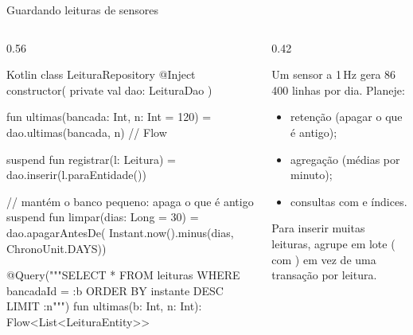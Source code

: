 \documentclass[aspectratio=169,10pt]{beamer}
\begin{document}
\begin{frame}[fragile]{Guardando leituras de sensores}
  \begin{columns}[T]
    \begin{column}{0.56\textwidth}
\begin{codigo}[title=LeituraRepository.kt]{Kotlin}
class LeituraRepository @Inject constructor(
  private val dao: LeituraDao
) {
  fun ultimas(bancada: Int, n: Int = 120) =
    dao.ultimas(bancada, n)          // Flow

  suspend fun registrar(l: Leitura) =
    dao.inserir(l.paraEntidade())

  // mantém o banco pequeno: apaga o que é antigo
  suspend fun limpar(dias: Long = 30) =
    dao.apagarAntesDe(
      Instant.now().minus(dias, ChronoUnit.DAYS))
}

@Query("""SELECT * FROM leituras WHERE bancadaId = :b
  ORDER BY instante DESC LIMIT :n""")
fun ultimas(b: Int, n: Int): Flow<List<LeituraEntity>>
\end{codigo}
    \end{column}
    \begin{column}{0.42\textwidth}
      \begin{atencao}
        Um sensor a 1\,Hz gera 86\,400 linhas por dia. Planeje:
        \begin{itemize}
          \item retenção (apagar o que é antigo);
          \item agregação (médias por minuto);
          \item consultas com  e índices.
        \end{itemize}
      \end{atencao}
      \begin{dica}
        Para inserir muitas leituras, agrupe em lote ( com ) em vez de uma transação por leitura.
      \end{dica}
    \end{column}
  \end{columns}
\end{frame}
\end{document}

